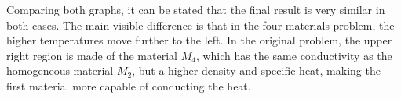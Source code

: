 Comparing both graphs, it can be stated that the final result is very similar in both cases. The main visible difference is that in the four materials problem, the higher temperatures move further to the left. In the original problem, the upper right region is made of the material $M_{4}$, which has the same conductivity as the homogeneous material $M_{2}$, but a higher density and specific heat, making the first material more capable of conducting the heat.